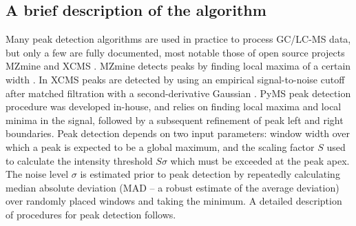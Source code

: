 \subsection{A brief description of the algorithm}

Many peak detection algorithms are used in practice to process GC/LC-MS data,
but only a few are fully documented, most notable those of open source
projects MZmine \cite{katajamaa06} and XCMS \cite{smith06}.  MZmine detects
peaks by finding local maxima of a certain width \cite{katajamaa06}. In XCMS
peaks are detected by using an empirical signal-to-noise cutoff after matched
filtration with a second-derivative Gaussian \cite{smith06}. PyMS peak
detection procedure was developed in-house, and relies on finding local
maxima and local minima in the signal, followed by a subsequent refinement
of peak left and right boundaries. Peak detection depends on two input
parameters: window width over which a peak is expected to be a global maximum,
and the scaling factor $S$ used to calculate the intensity threshold $S
\sigma$ which must be exceeded at the peak apex. The noise level $\sigma$
is estimated prior to peak detection by repeatedly calculating median
absolute deviation (MAD -- a robust estimate of the average deviation) over
randomly placed windows and taking the minimum. A detailed description of
procedures for peak detection follows. 

